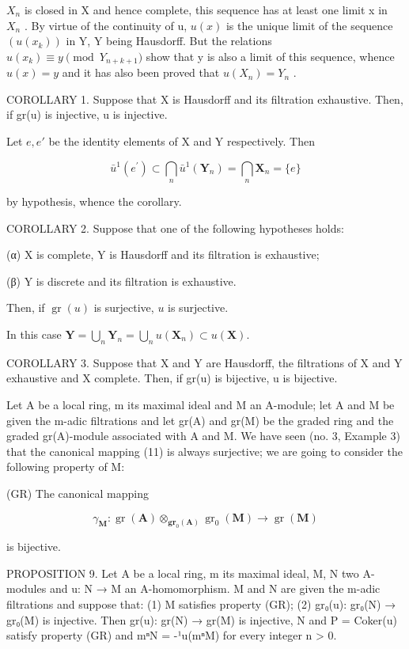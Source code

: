 \(X_{n}\) is closed in X and hence complete, this sequence has at least one limit x in \(X_{n}\) . By virtue of the continuity of u, \(u(x)\) is the unique limit of the sequence \((u(x_{k}))\) in Y, Y being Hausdorff. But the relations \(u(x_{k}) \equiv y \pmod{Y_{n+k+1}}\) show that y is also a limit of this sequence, whence \(u(x) = y\) and it has also been proved that \(u(X_{n}) = Y_{n}\) .

COROLLARY 1. Suppose that X is Hausdorff and its filtration exhaustive. Then, if gr(u) is injective, u is injective.

Let \(e, e'\) be the identity elements of X and Y respectively. Then

\[
\bar {u} ^ {1} (e ^ {\prime}) \subset \bigcap_ {n} \bar {u} ^ {1} (\mathbf {Y} _ {n}) = \bigcap_ {n} \mathbf {X} _ {n} = \{e \}
\]

by hypothesis, whence the corollary.

COROLLARY 2. Suppose that one of the following hypotheses holds:

(α) X is complete, Y is Hausdorff and its filtration is exhaustive;

(β) Y is discrete and its filtration is exhaustive.

Then, if \(\operatorname{gr}(u)\) is surjective, \(u\) is surjective.

In this case \(\mathbf{Y} = \bigcup_{n}\mathbf{Y}_{n} = \bigcup_{n}u(\mathbf{X}_{n})\subset u(\mathbf{X}).\)

COROLLARY 3. Suppose that X and Y are Hausdorff, the filtrations of X and Y exhaustive and X complete. Then, if gr(u) is bijective, u is bijective.

Let A be a local ring, m its maximal ideal and M an A-module; let A and M be given the m-adic filtrations and let gr(A) and gr(M) be the graded ring and the graded gr(A)-module associated with A and M. We have seen (no. 3, Example 3) that the canonical mapping (11) is always surjective; we are going to consider the following property of M:

(GR) The canonical mapping

\[
\gamma_ {\mathbf {M}} \colon \operatorname{gr} (\mathbf {A}) \otimes_ {\mathbf {g r} _ {0} (\mathbf {A})} \operatorname{gr} _ {0} (\mathbf {M}) \rightarrow \operatorname{gr} (\mathbf {M})
\]

is bijective.

PROPOSITION 9. Let A be a local ring, m its maximal ideal, M, N two A-modules and u: N → M an A-homomorphism. M and N are given the m-adic filtrations and suppose that: (1) M satisfies property (GR); (2) gr₀(u): gr₀(N) → gr₀(M) is injective. Then gr(u): gr(N) → gr(M) is injective, N and P = Coker(u) satisfy property (GR) and mⁿN = -¹u(mⁿM) for every integer n \textgreater{} 0.

